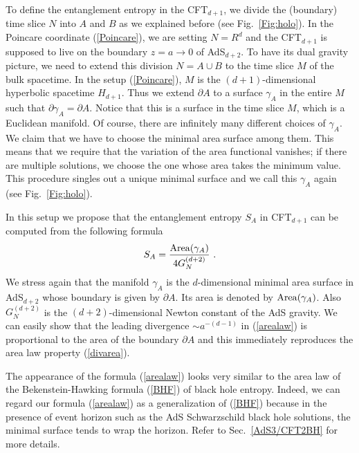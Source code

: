 \documentclass[12pt]{article}
\def\frac#1#2{{#1\over #2}}
\def\de{\partial}
\def\frac#1#2{{#1\over #2}}
\begin{document}
To define the entanglement entropy  in the CFT$_{d+1}$,
we divide the (boundary) time slice $N$
into $A$ and $B$ as we explained before (see Fig.\ \ref{Fig:holo}).
In the Poincare coordinate (\ref{Poincare}), we are setting $N=R^d$ and
the CFT$_{d+1}$ is supposed to live on the boundary $z=a\to 0$
of AdS$_{d+2}$.
To have its dual gravity picture, we need to extend
this division $N=A\cup B$ to the time slice $M$ of  the
bulk spacetime. In the setup (\ref{Poincare}),
$M$ is the $(d+1)$-dimensional hyperbolic spacetime $H_{d+1}$.
Thus we extend $\partial A$ to a surface $\gamma_A$ in the entire $M$ such
that $\partial \gamma_A=\partial A$. Notice that this is a surface
in the time slice $M$, which is a Euclidean manifold. Of course,
there are infinitely many different choices of $\gamma_A$. We claim
that we have to choose the minimal area surface among them. This means
that we require that the variation of the area functional vanishes;
if there are multiple solutions, we choose the one whose area takes
the minimum value. This procedure singles out a unique minimal surface
and we call this $\gamma_A$ again
(see Fig.\ \ref{Fig:holo}).

In this setup we propose that
the entanglement entropy $S_A$ in CFT$_{d+1}$ can be computed from
the following formula \cite{RuTa,RuTaL}
\begin{equation} S_{A}=\frac{{\rm Area}(\gamma_{A})}{4G^{(d+2)}_N} \ .
\label{arealaw}
\end{equation}
We stress again that the manifold $\gamma_{A}$ is
the $d$-dimensional minimal area
surface in AdS$_{d+2}$ whose boundary is given by $\de A$. Its area
is denoted by ${\rm Area}(\gamma_{A})$. Also $G^{(d+2)}_{N}$ is the
$(d+2)$-dimensional Newton constant of the AdS gravity.
We can easily show that the leading
divergence $\sim a^{-(d-1)}$ in (\ref{arealaw}) is proportional to
the area of the boundary $\de A$ and this immediately reproduces the
area law property (\ref{divarea}).

The appearance of the formula (\ref{arealaw}) looks very similar to the area law
of the Bekenstein-Hawking formula (\ref{BHF}) of black hole entropy.
Indeed, we can regard our formula (\ref{arealaw})
as a generalization of (\ref{BHF}) because in the presence of
event horizon
such as the AdS Schwarzschild black hole solutions, the minimal surface tends
to wrap the horizon. Refer to Sec.\ \ref{AdS3/CFT2BH} for more details.
\end{document}
